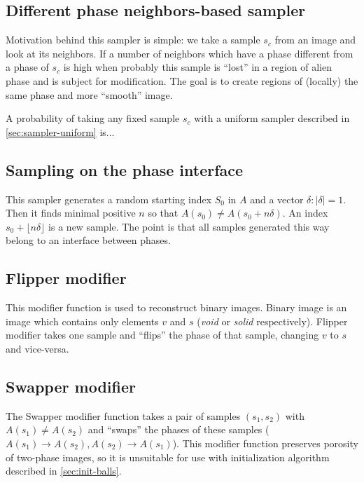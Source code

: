 \documentclass[preprint,amsmath,amssymb,aps,pre]{revtex4-1}
\begin{document}
\subsection{Different phase neighbors-based sampler}
\label{sec:sampler-dpn}
Motivation behind this sampler is simple: we take a sample $s_c$ from an image
and look at its neighbors. If a number of neighbors which have a phase different
from a phase of $s_c$ is high when probably this sample is ``lost'' in a region
of alien phase and is subject for modification. The goal is to create regions of
(locally) the same phase and more ``smooth'' image.

A probability of taking any fixed sample $s_c$ with a uniform sampler described
in \cref{sec:sampler-uniform} is...

\subsection{Sampling on the phase interface}
\label{sec:sampler-interface}
This sampler generates a random starting index $S_0$ in $A$ and a vector
$\delta: |\delta| = 1$. Then it finds minimal positive $n$ so that
$A(s_0) \ne A(s_0 + n\delta)$. An index $s_0 + \lfloor n\delta \rfloor$ is a new
sample. The point is that all samples generated this way belong to an interface
between phases.

\subsection{Flipper modifier}
\label{sec:flipper}
This modifier function is used to reconstruct binary images. Binary image is
an image which contains only elements $v$ and $s$ (\textit{void} or
\textit{solid} respectively). Flipper modifier takes one sample and ``flips''
the phase of that sample, changing $v$ to $s$ and vice-versa.

\subsection{Swapper modifier}
\label{sec:swapper}
The Swapper modifier function takes a pair of samples $(s_1, s_2)$ with
$A(s_1) \ne A(s_2)$ and ``swaps'' the phases of these samples
($A(s_1) \rightarrow A(s_2), A(s_2) \rightarrow A(s_1)$). This modifier function
preserves porosity of two-phase images, so it is unsuitable for use with
initialization algorithm described in \cref{sec:init-balls}.
\end{document}
